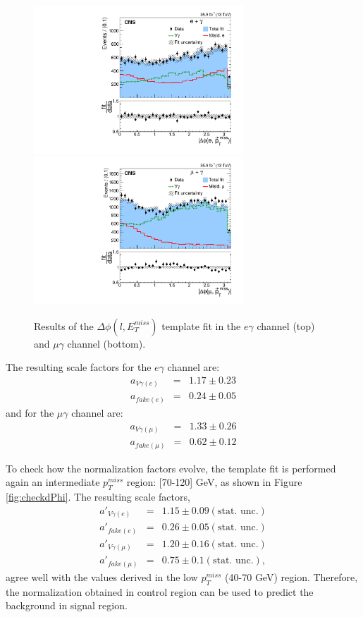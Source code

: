 \documentclass[thesis.tex]{subfiles}
\renewcommand\_{\textunderscore\allowbreak}
\begin{document}
\begin{figure}[hbtp]
  \centering
    \includegraphics[width=0.7\textwidth]{Fig/fit_dPhi_eg.pdf} \\
    \includegraphics[width=0.7\textwidth]{Fig/fit_dPhi_mg.pdf}
  \caption{Results of the $\Delta\phi(l,E_{T}^{miss})$ template fit in the $e\gamma$ channel (top) and $\mu\gamma$ channel (bottom).}
    \label{fig:dphifitresult}
\end{figure}

The resulting scale factors for the $e\gamma$ channel are:
\begin{eqnarray*}
	a_{V\gamma(e)} &=& 1.17 \pm 0.23 \\
	a_{fake(e)}  &=& 0.24 \pm 0.05
\end{eqnarray*}
and for the $\mu\gamma$ channel are:
\begin{eqnarray*}
	a_{V\gamma(\mu)} &=& 1.33 \pm 0.26 \\
	a_{fake(\mu)}  &=& 0.62 \pm 0.12
\end{eqnarray*}

To check how the normalization factors evolve, the template fit is performed again an intermediate $p_T^{miss}$ region: [70-120] GeV, as shown in Figure \ref{fig:checkdPhi}. 
The resulting scale factors, 
\begin{eqnarray*}
	a'_{V\gamma(e)} &=& 1.15 \pm 0.09 (\text{stat. unc.}) \\
	a'_{fake(e)}  &=& 0.26 \pm 0.05 (\text{stat. unc.}) \\
	a'_{V\gamma(\mu)} &=& 1.20 \pm 0.16 (\text{stat. unc.}) \\
	a'_{fake(\mu)}  &=& 0.75 \pm 0.1 (\text{stat. unc.}),
\end{eqnarray*}
agree well with the values derived in the low $p_T^{miss}$ (40-70 GeV) region. 
Therefore, the normalization obtained in control region can be used to predict the background in signal region.
\end{document}
